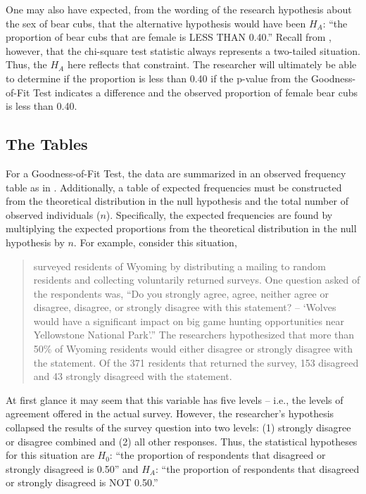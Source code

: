 \documentclass[10pt,openany]{book}\usepackage[]{graphicx}\usepackage[]{color}
\begin{document}
One may also have expected, from the wording of the research hypothesis about the sex of bear cubs, that the alternative hypothesis would have been $H_{A}$: ``the proportion of bear cubs that are female is LESS THAN 0.40.''  Recall from , however, that the chi-square test statistic always represents a two-tailed situation. Thus, the $H_{A}$ here reflects that constraint. The researcher will ultimately be able to determine if the proportion is less than 0.40 if the p-value from the Goodness-of-Fit Test indicates a difference and the observed proportion of female bear cubs is less than 0.40.

\subsection{The Tables}
For a Goodness-of-Fit Test, the data are summarized in an observed frequency table as in . Additionally, a table of expected frequencies must be constructed from the theoretical distribution in the null hypothesis and the total number of observed individuals ($n$). Specifically, the expected frequencies are found by multiplying the expected proportions from the theoretical distribution in the null hypothesis by $n$. For example, consider this situation,

\begin{quote}
\cite{BathBuchanan1989} surveyed residents of Wyoming by distributing a mailing to random residents and collecting voluntarily returned surveys. One question asked of the respondents was, ``Do you strongly agree, agree, neither agree or disagree, disagree, or strongly disagree with this statement? -- `Wolves would have a significant impact on big game hunting opportunities near Yellowstone National Park'.''  The researchers hypothesized that more than 50\% of Wyoming residents would either disagree or strongly disagree with the statement. Of the 371 residents that returned the survey, 153 disagreed and 43 strongly disagreed with the statement.
\end{quote}

At first glance it may seem that this variable has five levels -- i.e., the levels of agreement offered in the actual survey. However, the researcher's hypothesis collapsed the results of the survey question into two levels: (1) strongly disagree or disagree combined and (2) all other responses. Thus, the statistical hypotheses for this situation are $H_{0}$: ``the proportion of respondents that disagreed or strongly disagreed is 0.50'' and $H_{A}$: ``the proportion of respondents that disagreed or strongly disagreed is NOT 0.50.''
\end{document}
